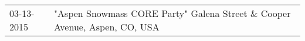 \begin{supertabular}{ll}
 03-13-2015 &  "Aspen Snowmass CORE Party" Galena Street \& Cooper Avenue, Aspen, CO, USA \\
\end{supertabular}
